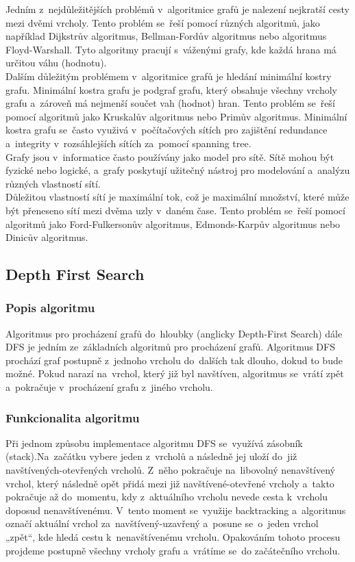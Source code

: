 \documentclass[12pt, titlepage, a4paper]{article}
\begin{document}
Jedním z~nejdůležitějších problémů v~algoritmice grafů je nalezení nejkratší cesty mezi 
dvěmi vrcholy. Tento problém se~řeší pomocí různých algoritmů, jako například Dijkstrův 
algoritmus, Bellman-Fordův algoritmus nebo algoritmus Floyd-Warshall. Tyto algoritmy 
pracují s~váženými grafy, kde každá hrana má určitou váhu (hodnotu).
\\

Dalším důležitým problémem v~algoritmice grafů je hledání minimální kostry grafu. Minimální 
kostra grafu je podgraf grafu, který obsahuje všechny vrcholy grafu a~zároveň má nejmenší 
součet vah (hodnot) hran. Tento problém se~řeší pomocí algoritmů jako Kruskalův algoritmus nebo Primův 
algoritmus. Minimální kostra grafu se~často využivá v~počítačových sítích pro zajištění redundance
a~integrity v~rozsáhlejších sítích za~pomocí spanning tree.
\\

Grafy jsou v~informatice často používány jako model pro sítě. Sítě mohou být fyzické nebo 
logické, a~grafy poskytují užitečný nástroj pro modelování a~analýzu různých vlastností sítí.
\\

Důležitou vlastností sítí je maximální tok, což je maximální množství, které může být přeneseno 
sítí mezi dvěma uzly v~daném čase. Tento problém se~řeší pomocí algoritmů jako Ford-Fulkersonův 
algoritmus, Edmonds-Karpův algoritmus nebo Dinicův algoritmus.
~\cite{GeeksforGeeks: Algorithms}
\clearpage

\subsection{Depth First Search}
\subsubsection{Popis algoritmu}
Algoritmus pro procházení grafů do~hloubky (anglicky Depth-First Search) dále DFS
je jedním ze~základních algoritmů pro procházení grafů. Algoritmus DFS prochází 
graf postupně z~jednoho vrcholu do~dalších tak dlouho, dokud to bude možné. 
Pokud narazí na~vrchol, který již byl navštíven, algoritmus se~vrátí zpět a~pokračuje 
v~procházení grafu z~jiného vrcholu.
~\cite{GeeksforGeeks: DFS,Khan Academy: DFS}

\subsubsection{Funkcionalita algoritmu}
Při jednom způsobu implementace algoritmu DFS se~využívá zásobník (stack).Na~začátku vybere jeden z~vrcholů a 
následně jej uloží do~již navštívených-otevřených vrcholů. Z~něho pokračuje na~libovolný nenavštívený vrchol, 
který následně opět přidá mezi již navštívené-otevřené vrcholy a~takto pokračuje až do~momentu, kdy 
z~aktuálního vrcholu nevede cesta k~vrcholu doposud nenavštívenému. V~tento moment se~využije 
backtracking a~algoritmus označí aktuální vrchol za~navštívený-uzavřený a~posune se~o~jeden vrchol 
„zpět“, kde hledá cestu k~nenavštívenému vrcholu. Opakováním tohoto procesu projdeme postupně 
všechny vrcholy grafu a~vrátíme se~do začátečního vrcholu.
\\
\end{document}
